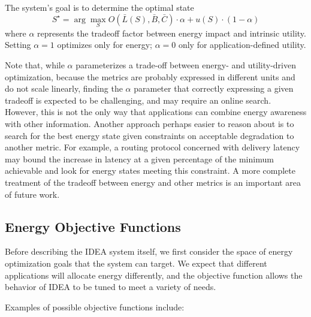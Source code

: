 The system's goal is to determine the optimal state \[ S^\star = \arg
\max_{S} O(\bar{L}(S), \bar{B}, \bar{C}) \cdot \alpha + u(S) \cdot
(1-\alpha)\] where $\alpha$ represents the tradeoff factor between energy
impact and intrinsic utility. Setting $\alpha=1$ optimizes only for energy;
$\alpha=0$ only for application-defined utility.

Note that, while $\alpha$ parameterizes a trade-off between energy- and
utility-driven optimization, because the metrics are probably expressed in
different units and do not scale linearly, finding the $\alpha$ parameter
that correctly expressing a given tradeoff is expected to be challenging, and
may require an online search. However, this is not the only way that
applications can combine energy awareness with other information. Another
approach perhaps easier to reason about is to search for the best energy
state given constraints on acceptable degradation to another metric. For
example, a routing protocol concerned with delivery latency may bound the
increase in latency at a given percentage of the minimum achievable and look
for energy states meeting this constraint. A more complete treatment of the
tradeoff between energy and other metrics is an important area of future
work.

\subsection{Energy Objective Functions}
\label{idea-subsec-energyobjectivefunctions}

Before describing the IDEA system itself, we first consider the space of
energy optimization goals that the system can target. We expect that
different applications will allocate energy differently, and the objective
function allows the behavior of IDEA to be tuned to meet a variety of needs. 

Examples of possible objective functions include:

